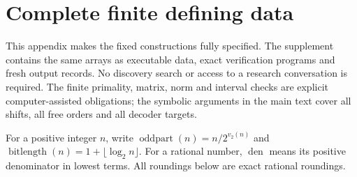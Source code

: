 \section{Complete finite defining data}\label{v2:app:data}\label{vi:app:compute}
This appendix makes the fixed constructions fully specified. The supplement
contains the same arrays as executable data, exact verification programs and
fresh output records. No discovery search or access to a research conversation
is required. The finite primality, matrix, norm and interval checks are explicit
computer-assisted obligations; the symbolic arguments in the main text cover
all shifts, all free orders and all decoder targets.

For a positive integer $n$, write $\operatorname{oddpart}(n)=n/2^{v_2(n)}$
and $\operatorname{bitlength}(n)=1+\lfloor\log_2n\rfloor$.
For a rational number, $\operatorname{den}$ means its positive denominator
in lowest terms. All roundings below are exact rational roundings.

